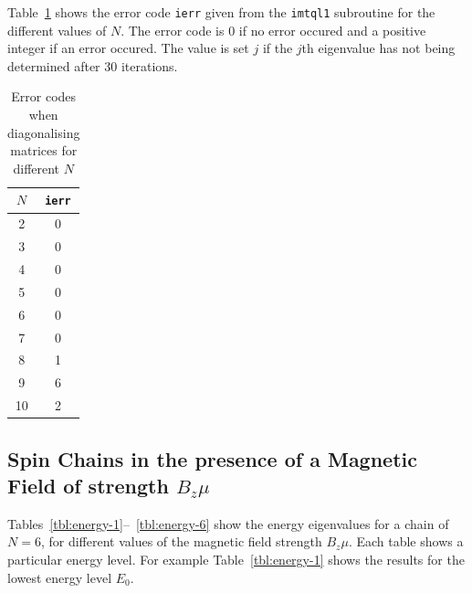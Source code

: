 \documentclass[a4paper]{IEEEtran}
\begin{document}
    Table~\ref{tbl:error-codes} shows the error code \texttt{ierr} given from the 
    \texttt{imtql1} subroutine for the different values of $N$. The error code
    is 0 if no error occured and a positive integer if an error occured. The value
    is set $j$ if the $j$th eigenvalue has not being determined after 30 iterations.

    \begin{table} 
        \caption{Error codes when diagonalising matrices for different $N$}
        \label{tbl:error-codes} 
    \begin{center}
        \begin{tabular}{|c|c|} \hline
        $N$ & \texttt{ierr} \\ \hline \hline
        2 & 0 \\ \hline
        3 & 0 \\ \hline
        4 & 0 \\ \hline
        5 & 0 \\ \hline
        6 & 0 \\ \hline
        7 & 0 \\ \hline
        8 & 1 \\ \hline
        9 & 6 \\ \hline
       10 & 2 \\ \hline
        \end{tabular}
    \end{center}
    \end{table} 
  
    \subsection*{Spin Chains in the presence of a Magnetic Field of strength $B_z\mu$}
    Tables~\ref{tbl:energy-1}--~\ref{tbl:energy-6} 
    show the energy eigenvalues for a chain of $N=6$, for different 
    values of the magnetic field strength $B_z\mu$. Each table shows 
    a particular energy level. For example Table~\ref{tbl:energy-1} 
    shows the results for the lowest energy level $E_0$.
\end{document}
